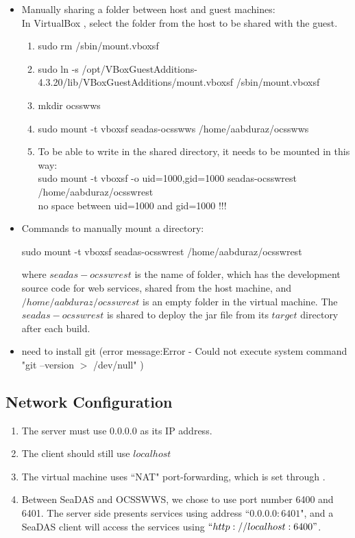 \documentclass[11pt, oneside]{article}   	%
\begin{document}
\begin{itemize}

\item Manually sharing a folder between host and guest machines: \\
In VirtualBox {\color{blue}{\bf Devices  $\rightarrow $  Shared Folder Settings...  $\rightarrow $ Shared Folders  $\rightarrow $  Machine Folders}}, select the folder from the host to be shared with the guest.
   \begin{enumerate}
      \item sudo rm /sbin/mount.vboxsf
      \item sudo ln -s /opt/VBoxGuestAdditions-4.3.20/lib/VBoxGuestAdditions/mount.vboxsf /sbin/mount.vboxsf
      \item mkdir ocsswws
      \item sudo mount -t vboxsf seadas-ocsswws /home/aabduraz/ocsswws
      \item To be able to write in the shared directory, it needs to be mounted in this way:\\
      sudo mount -t vboxsf -o uid=1000,gid=1000 seadas-ocsswrest /home/aabduraz/ocsswrest \\
      {\color{red} no space between uid=1000 and gid=1000 !!!}

   \end{enumerate}

\item Commands to manually mount a directory:
\begin{code}
sudo mount -t vboxsf seadas-ocsswrest /home/aabduraz/ocsswrest
\end{code}
where $seadas-ocsswrest$ is the name of folder, which has the development source code for web services, shared from the host machine, and $/home/aabduraz/ocsswrest$ is an empty folder in the virtual machine. The  $seadas-ocsswrest$ is shared to deploy the jar file from its $target$ directory after each build. 

\item need to install git
(error message:Error - Could not execute system command "git --version $>$ /dev/null" )

\end{itemize}

\subsection{Network Configuration}
\begin{enumerate}
\item The server must use $0.0.0.0$ as its IP address.
\item The client should still use $localhost$
\item The virtual machine uses ``NAT" port-forwarding, which is set through {\color{blue}{\bf Devices $\rightarrow$ Network $\rightarrow$ Network Settings ... }}.
\item  Between SeaDAS and OCSSWWS, we chose to use port number 6400 and 6401. The server side presents services using address ``$0.0.0.0:6401$", and a SeaDAS client will access the services using $``http://localhost:6400"$.
\end{enumerate}
\end{document}
